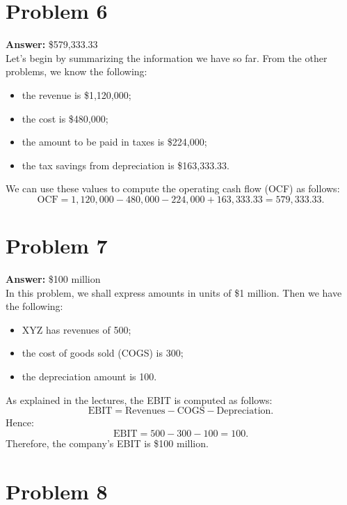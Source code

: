 \documentclass[11pt]{article}
\begin{document}
\section*{Problem 6}
\label{sec:org79d6aad}

\textbf{Answer:} \$579,333.33\\

Let's begin by summarizing the information we have so far. From the other
problems, we know the following:
\begin{itemize}
\item the revenue is \$1,120,000;
\item the cost is \$480,000;
\item the amount to be paid in taxes is \$224,000;
\item the tax savings from depreciation is \$163,333.33.
\end{itemize}
We can use these values to compute the operating cash flow (OCF) as follows:
\begin{equation}
\mathrm{OCF}=1,120,000-480,000-224,000+163,333.33=579,333.33.
\end{equation}
\section*{Problem 7}
\label{sec:org4eead2f}

\textbf{Answer:} \$100 million\\

In this problem, we shall express amounts in units of \$1 million. Then we have
the following:
\begin{itemize}
\item XYZ has revenues of 500;
\item the cost of goods sold (COGS) is 300;
\item the depreciation amount is 100.
\end{itemize}
As explained in the lectures, the EBIT is computed as follows:
\begin{equation}
\mathrm{EBIT}=\mathrm{Revenues}-\mathrm{COGS}-\mathrm{Depreciation}.
\end{equation}
Hence:
\begin{equation}
\mathrm{EBIT}=500-300-100=100.
\end{equation}
Therefore, the company's EBIT is \$100 million.
\section*{Problem 8}
\label{sec:org9c7c94d}
\end{document}
